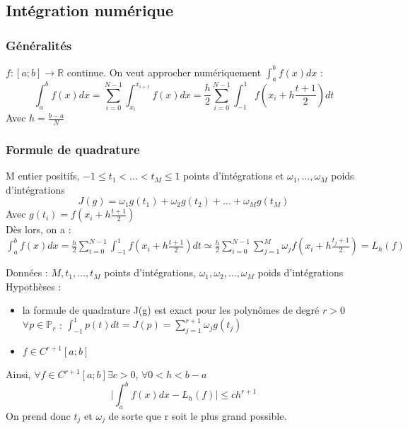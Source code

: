\documentclass[../main.tex]{subfiles}
\begin{document}
\subsection{Intégration numérique}
\subsubsection{Généralités}
$f:[a;b] \rightarrow \mathbb{R}$ continue. On veut approcher numériquement $\int_a^bf(x)dx$ :\\
\begin{equation}
    \int_a^bf(x)dx = \sum_{i=0}^{N-1} \int_{x_i}^{x_{i+1}}f(x)dx = \frac{h}{2} \sum_{i=0}^{N-1} \int_{-1}^1 f(x_i + h\frac{t+1}{2})dt
\end{equation}
Avec $h = \frac{b-a}{N}$\\


\subsubsection{Formule de quadrature}
M entier positifs, $-1\leq t_1 < \dots < t_M \leq 1$ points d'intégrations et $\omega_1, \dots, \omega_M$ poids d'intégrations\\

\begin{equation}
    J(g) = \omega_1 g(t_1) + \omega_2 g(t_2) + \dots + \omega_M g(t_M)
\end{equation}
Avec $g(t_i) = f(x_i + h\frac{t+1}{2})$\\
Dès lors, on a : $\int_a^b f(x)dx = \frac{h}{2} \sum_{i=0}^{N-1} \int_{-1}^1 f(x_i + h\frac{t+1}{2}) dt \simeq \frac{h}{2} \sum_{i=0}^{N-1} \sum_{j=1}^M \omega_j f(x_i + h\frac{t_j+1}{2}) = L_h(f)$\\

\begin{theorem}
Données : $M, t_1, \dots, t_M$ points d'intégrations, $\omega_1, \omega_2, \dots, \omega_M$ poids d'intégrations\\
Hypothèses : \begin{itemize}
    \item la formule de quadrature J(g) est exact pour les polynômes de degré $r>0$ $\forall p\in \mathbb{P}_r$ : $\int_{-1}^1p(t)dt = J(p) = \sum_{j=1}^{r+1}\omega_j g(t_j)$\\
    \item $f\in C^{r+1} [a;b]$\\
\end{itemize}

Ainsi, $\forall f \in C^{r+1}[a;b] \exists c>0$, $\forall 0 <h<b-a$\\
\begin{equation}
    \lvert \int_a^b f(x)dx-L_h(f)\rvert \leq ch^{r+1}
\end{equation}
On prend donc $t_j$ et $\omega_j$ de sorte que r soit le plus grand possible.\\
\end{theorem}
\end{document}
